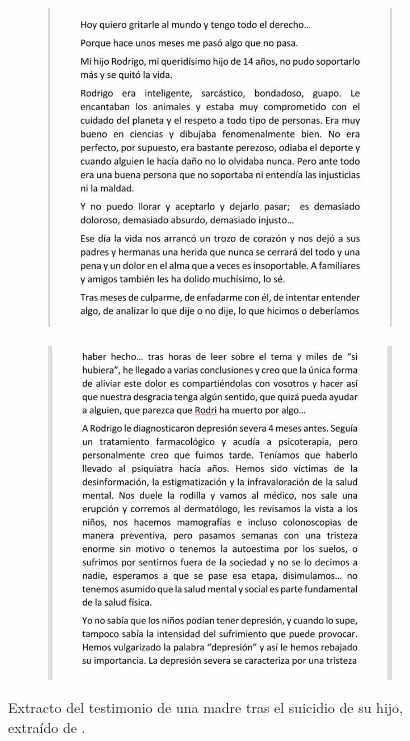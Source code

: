     \begin{figure}[h]
        \begin{subfigure}[b]{0.49\textwidth}
            \includegraphics[width=1\linewidth]{figures/testimonio_madre_1.jpg}
        \end{subfigure}
        \hfill
        \begin{subfigure}[b]{0.49\textwidth}
            \includegraphics[width=1\linewidth]{figures/testimonio_madre_2.jpg}
        \end{subfigure}
        \caption[Extracto del testimonio de una madre tras el suicidio de su hijo]{Extracto del testimonio de una madre tras el suicidio de su hijo, extraído de \cite{irene_pujol_i_athenea_hace_2021}.}
        \label{fig:intro_testimonio_madre}
    \end{figure}

